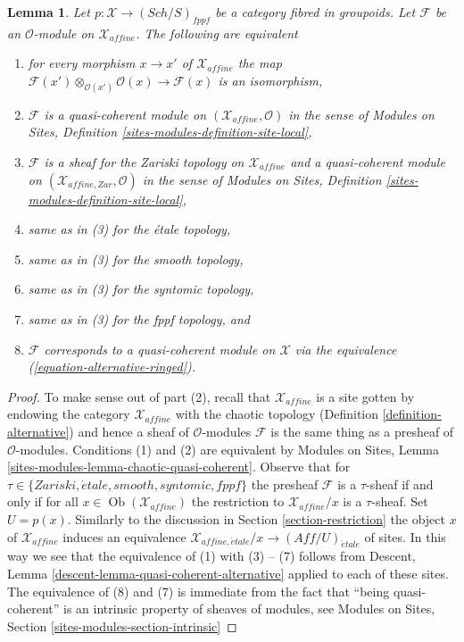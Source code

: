 \documentclass{stacks-project}
\theoremstyle{plain}
\newtheorem{lemma}[subsection]{Lemma}
\theoremstyle{definition}
\theoremstyle{remark}
\numberwithin{equation}{subsection}
\def\Sch{\mathit{Sch}}
\def\Ob{\mathop{\mathrm{Ob}}\nolimits}
\def\etale{{\acute{e}tale}}
\begin{document}
\begin{lemma}
\label{lemma-quasi-coherent-alternative}
Let $p : \mathcal{X} \to (\Sch/S)_{fppf}$ be a category fibred in groupoids.
Let $\mathcal{F}$ be an $\mathcal{O}$-module on $\mathcal{X}_{affine}$.
The following are equivalent
\begin{enumerate}
\item for every morphism $x \to x'$ of $\mathcal{X}_{affine}$ the map
$\mathcal{F}(x') \otimes_{\mathcal{O}(x')} \mathcal{O}(x) \to \mathcal{F}(x)$
is an isomorphism,
\item $\mathcal{F}$ is a quasi-coherent module on
$(\mathcal{X}_{affine}, \mathcal{O})$ in the sense of
Modules on Sites, Definition \ref{sites-modules-definition-site-local},
\item $\mathcal{F}$ is a sheaf for the Zariski topology on
$\mathcal{X}_{affine}$ and a quasi-coherent module on
$(\mathcal{X}_{affine, Zar}, \mathcal{O})$ in the sense of
Modules on Sites, Definition \ref{sites-modules-definition-site-local},
\item same as in (3) for the \'etale topology,
\item same as in (3) for the smooth topology,
\item same as in (3) for the syntomic topology,
\item same as in (3) for the fppf topology, and
\item $\mathcal{F}$ corresponds to a quasi-coherent module
on $\mathcal{X}$ via the equivalence (\ref{equation-alternative-ringed}).
\end{enumerate}
\end{lemma}

\begin{proof}
To make sense out of part (2), recall that $\mathcal{X}_{affine}$ is a site
gotten by endowing the category $\mathcal{X}_{affine}$ with the chaotic
topology (Definition \ref{definition-alternative}) and hence a sheaf
of $\mathcal{O}$-modules $\mathcal{F}$ is the same thing as
a presheaf of $\mathcal{O}$-modules. Conditions (1) and (2)
are equivalent by Modules on Sites, Lemma
\ref{sites-modules-lemma-chaotic-quasi-coherent}.
Observe that for $\tau \in \{Zariski, \etale, smooth, syntomic, fppf\}$
the presheaf $\mathcal{F}$ is a $\tau$-sheaf if and only if
for all $x \in \Ob(\mathcal{X}_{affine})$ the restriction
to $\mathcal{X}_{affine}/x$ is a $\tau$-sheaf. Set $U = p(x)$.
Similarly to the discussion in Section \ref{section-restriction}
the object $x$ of $\mathcal{X}_{affine}$ induces an equivalence
$\mathcal{X}_{affine, \etale}/x \to (\textit{Aff}/U)_\etale$ of sites.
In this way we see that the equivalence of (1) with (3) -- (7)
follows from Descent, Lemma \ref{descent-lemma-quasi-coherent-alternative}
applied to each of these sites. The equivalence of (8) and (7)
is immediate from the fact that ``being quasi-coherent'' is an
intrinsic property of sheaves of modules, see
Modules on Sites, Section \ref{sites-modules-section-intrinsic}
\end{proof}
\end{document}
